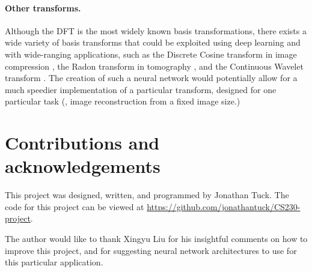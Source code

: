 \documentclass[12pt]{article}
\begin{document}
\paragraph{Other transforms.} Although the DFT is the most widely known basis transformations, there exists a wide variety of
basis transforms that could be exploited using deep learning and with wide-ranging applications, such as the Discrete
Cosine transform in image compression \cite{ANR:74,YL:95}, the Radon transform in tomography \cite{D:07}, and the Continuous 
Wavelet transform \cite{M:08}. The creation of such a neural network would potentially allow for a much speedier implementation 
of a particular transform, designed for one particular task (\eg, image reconstruction from a fixed image size.)

\section{Contributions and acknowledgements}
This project was designed, written, and programmed by Jonathan Tuck. The code for this project can be viewed at 
\url{https://github.com/jonathantuck/CS230-project}.

The author would like to thank Xingyu Liu for his insightful comments on how to improve this project, and for suggesting 
neural network architectures to use for this particular application.

\newpage

\end{document}
